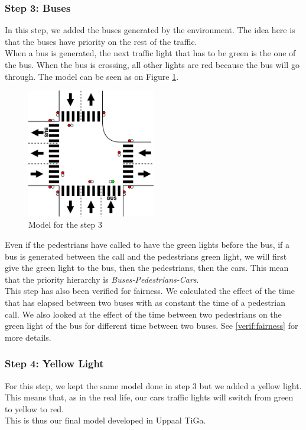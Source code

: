 \subsubsection{Step 3: Buses}
In this step, we added the buses generated by the environment. The idea here is that the buses have priority on the rest of the traffic. \\
When a bus is generated, the next traffic light that has to be green is the one of the bus. When the bus is crossing, all other lights are red because the bus will go through. The model can be seen as on Figure \ref{fig:step3bus}. \\

\begin{figure}[H]\label{fig:step3bus}
  \centering
    \includegraphics[width=0.5\textwidth]{picture/model/trafficlight_step3_s2.png}
    \caption{Model for the step 3}
\end{figure}


\noindent Even if the pedestrians have called to have the green lights before the bus, if a bus is generated between the call and the pedestrians green light, we will first give the green light to the bus, then the pedestrians, then the cars. This mean that the priority hierarchy is \textit{Buses-Pedestrians-Cars}. \\

This step has also been verified for fairness. We calculated the effect of the time that has elapsed between two buses with as constant the time of a pedestrian call. We also looked at the effect of the time between two pedestrians on the green light of the bus for different time between two buses. See \ref{verif:fairness} for more details.


\subsubsection{Step 4: Yellow Light}\label{sec:step4}
For this step, we kept the same model done in step 3 but we added a yellow light. This means that, as in the real life, our cars traffic lights will switch from green to yellow to red. \\
This is thus our final model developed in Uppaal TiGa.

